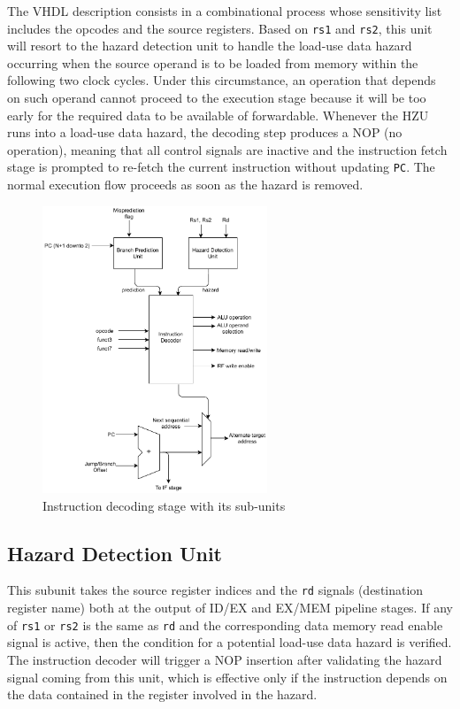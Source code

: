 The VHDL description consists in a combinational process whose sensitivity list includes the opcodes and the source registers. Based on \texttt{rs1} and \texttt{rs2}, this unit will resort to the hazard detection unit to handle the load-use data hazard occurring when the source operand is to be loaded from memory within the following two clock cycles. Under this circumstance, an operation that depends on such operand cannot proceed to the execution stage because it will be too early for the required data to be available of forwardable. Whenever the HZU runs into a load-use data hazard, the decoding step produces a NOP (no operation), meaning that all control signals are inactive and the instruction fetch stage is prompted to re-fetch the current instruction without updating \texttt{PC}. The normal execution flow proceeds as soon as the hazard is removed.

\begin{figure}[htb]
    \center
	\includegraphics[width=0.6\textwidth]{./images/idstage.pdf}
	\caption{Instruction decoding stage with its sub-units}
	\label{fig:idstage}
\end{figure}

\subsection{Hazard Detection Unit} This subunit takes the source register indices and the \texttt{rd} signals (destination register name) both at the output of ID/EX and EX/MEM pipeline stages. If any of \texttt{rs1} or \texttt{rs2} is the same as \texttt{rd} and the corresponding data memory read enable signal is active, then the condition for a potential load-use data hazard is verified. The instruction decoder will trigger a NOP insertion after validating the hazard signal coming from this unit, which is effective only if the instruction depends on the data contained in the register involved in the hazard.


